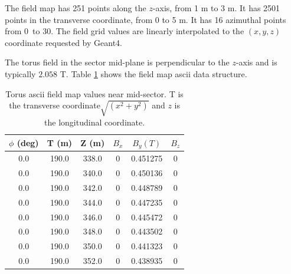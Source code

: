 The field map has 251 points along the $z$-axis, from 1 m to 3 m. It has 2501 points in the transverse coordinate, from 0 to 5 m.
It has 16 azimuthal points from 0\mdeg \ to 30\mdeg. The field grid values are linearly interpolated to the $(x,y,z)$
coordinate requested by Geant4.

The torus field in the sector mid-plane is perpendicular to the $z$-axis and is typically $2.058$ T.
Table \ref{tab:torMap} shows the field map ascii data structure.

\begin{table}[h]
	\begin{center}
		\begin{tabular}{| c | c | c | c | c | c | }
		 \hline \hline
         $\phi$ (deg) & T (m)    & Z (m)    &  $B_x$  &    $B_y (T)$    & $B_z$\\
			\hline
          0.0         &  190.0   &  338.0   &  0       &     0.451275 &  0 \\
          0.0         &  190.0   &  340.0   &  0       &     0.450136 &  0 \\
          0.0         &  190.0   &  342.0   &  0       &     0.448789 &  0 \\
          0.0         &  190.0   &  344.0   &  0       &     0.447235 &  0 \\
          0.0         &  190.0   &  346.0   &  0       &     0.445472 &  0 \\
          0.0         &  190.0   &  348.0   &  0       &     0.443502 &  0 \\
          0.0         &  190.0   &  350.0   &  0       &     0.441323 &  0 \\
          0.0         &  190.0   &  352.0   &  0       &     0.438935 &  0 \\
		\hline \hline
		\end{tabular}
	\end{center}
	\caption{Torus ascii field map values near mid-sector. T is the transverse coordinate$\sqrt{(x^2+y^2)}$ and
             $z$ is the longitudinal coordinate.}
 	\label{tab:torMap}
\end{table}


